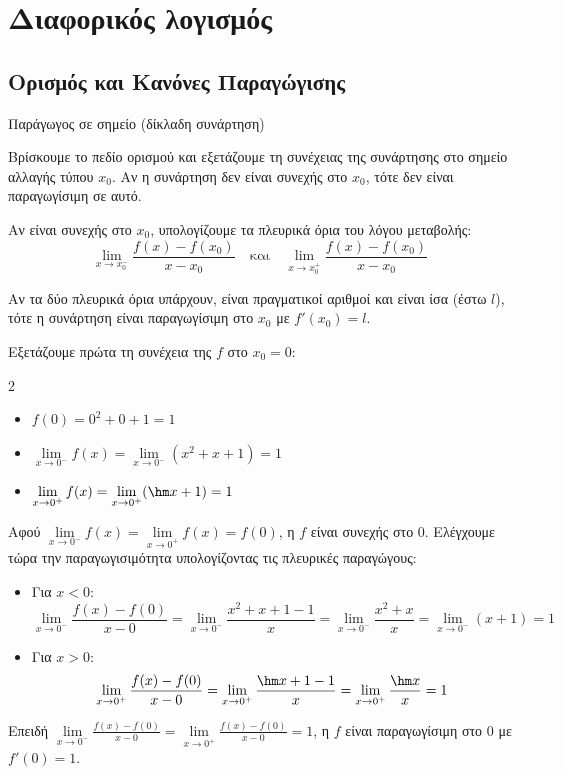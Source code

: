 \section{Διαφορικός λογισμός}
\subsection{Ορισμός και Κανόνες Παραγώγισης}
\begin{askhsh}{Παράγωγος σε σημείο (δίκλαδη συνάρτηση)}
\bhmata\begin{bhma}
\item Βρίσκουμε το πεδίο ορισμού και εξετάζουμε τη συνέχειας της συνάρτησης στο σημείο αλλαγής τύπου $x_0$. Αν η συνάρτηση δεν είναι συνεχής στο $x_0$, τότε δεν είναι παραγωγίσιμη σε αυτό.
\item Αν είναι συνεχής στο $x_0$, υπολογίζουμε τα πλευρικά όρια του λόγου μεταβολής:
\[ \lim\limits_{x\to x_0^-}\frac{f(x)-f(x_0)}{x-x_0} \quad \text{και} \quad \lim\limits_{x\to x_0^+}\frac{f(x)-f(x_0)}{x-x_0} \]
\item Αν τα δύο πλευρικά όρια υπάρχουν, είναι πραγματικοί αριθμοί και είναι ίσα (έστω $l$), τότε η συνάρτηση είναι παραγωγίσιμη στο $x_0$ με $f'(x_0) = l$.
\end{bhma}
\end{askhsh}


\lysh
Εξετάζουμε πρώτα τη συνέχεια της $f$ στο $x_0=0$:
\begin{multicols}{2}
\begin{itemize}
\item $f(0) = 0^2+0+1 = 1$
\item $\lim\limits_{x\to 0^-} f(x) = \lim\limits_{x\to 0^-} (x^2+x+1) = 1$
\item $\lim\limits_{x\to 0^+} f(x) = \lim\limits_{x\to 0^+} (\hm x + 1) = 1$
\end{itemize}
\end{multicols}
Αφού $\lim\limits_{x\to 0^-} f(x) = \lim\limits_{x\to 0^+} f(x) = f(0)$, η $f$ είναι συνεχής στο $0$. Ελέγχουμε τώρα την παραγωγισιμότητα υπολογίζοντας τις πλευρικές παραγώγους:
\begin{itemize}
\item Για $x < 0$: 
\[ \lim\limits_{x\to 0^-} \frac{f(x)-f(0)}{x-0} = \lim\limits_{x\to 0^-} \frac{x^2+x+1-1}{x} = \lim\limits_{x\to 0^-} \frac{x^2+x}{x} = \lim\limits_{x\to 0^-} (x+1) = 1 \]
\item Για $x > 0$: 
\[ \lim\limits_{x\to 0^+} \frac{f(x)-f(0)}{x-0} = \lim\limits_{x\to 0^+} \frac{\hm x + 1 - 1}{x} = \lim\limits_{x\to 0^+} \frac{\hm x}{x} = 1 \]
\end{itemize}
Επειδή $\lim\limits_{x\to 0^-} \frac{f(x)-f(0)}{x-0} = \lim\limits_{x\to 0^+} \frac{f(x)-f(0)}{x-0} = 1$, η $f$ είναι παραγωγίσιμη στο $0$ με $f'(0) = 1$.

